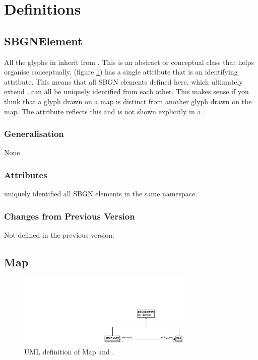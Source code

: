 \section{Definitions}
\label{sec:definitions}

\subsection{SBGNElement}
\label{defn:SBGNElement}

All the glyphs in \SBGNPDLone inherit from
. This is an abstract or conceptual class that
helps organise \PD conceptually.  (figure
\ref{fig:mapuml}) has a single attribute  that is an
identifying attribute. This means that all SBGN elements defined here,
which ultimately extend , can all be uniquely
identified from each other. This makes sense if you think that a glyph
drawn on a map is distinct from another glyph drawn on the map. The
 attribute reflects this and is not shown explicitly in a
\PDm.


\subsubsection{Generalisation}

None

\subsubsection{Attributes}

\begin{attributes}
   uniquely identified all SBGN elements in
  the same namespace.
\end{attributes}

\subsubsection{Changes from Previous Version}

Not defined in the previous version.

\subsection{Map}
\label{defn:Map}\label{sec:map}


\begin{figure}[h!]
  \centering
  \includegraphics[width=0.75\textwidth]{images/mapuml}
  \caption{UML definition of Map and .}
  \label{fig:mapuml}
\end{figure}

